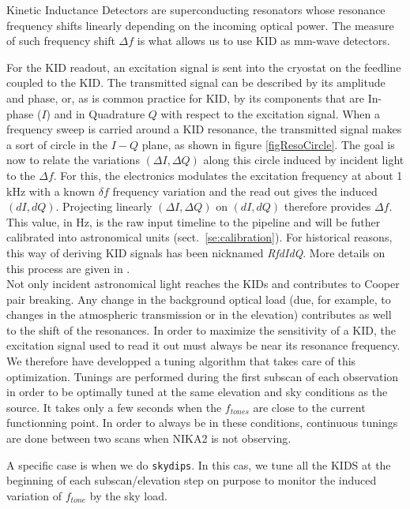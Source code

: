 Kinetic Inductance Detectors are superconducting resonators whose resonance
frequency shifts linearly depending on the incoming optical power. The measure of such
frequency shift $\Delta f$ is what allows us to use KID as mm-wave detectors.

For the KID readout, an excitation signal is sent into the cryostat on the
feedline coupled to the KID. The transmitted signal can be described by its
amplitude and phase, or, as is common practice for KID, by its components that
are In-phase ($I$) and in Quadrature $Q$ with respect to the excitation
signal. When a frequency sweep is carried around a KID resonance, the
transmitted signal makes a sort of circle in the $I-Q$ plane, as shown in figure
\ref{figResoCircle}. The goal is now to relate the variations $(\Delta I, \Delta
Q)$ along this circle induced by incident light to the $\Delta f$. For this, the
electronics modulates the excitation frequency at about 1\,kHz with a known
$\delta f$ frequency variation and the read out gives the induced $(dI,
dQ)$. Projecting linearly $(\Delta I, \Delta Q)$ on $(dI, dQ)$ therefore
provides $\Delta f$. This value, in Hz, is the raw input timeline to the
pipeline and will be futher calibrated into astronomical units
(sect.~\ref{se:calibration}). For historical reasons, this way of deriving KID
signals has been nicknamed \emph{RfdIdQ}. More details on this process are given
in \cite{Calvo13}.\\

Not only incident astronomical light reaches the KIDs and contributes to Cooper
pair breaking. Any change in the background optical load (due, for example, to changes in
the atmospheric transmission or in the elevation) contributes as well to the
shift of the resonances. In order to maximize the sensitivity of a KID, the
excitation signal used to read it out must always be near its resonance
frequency. We therefore have developped a tuning algorithm that takes care of
this optimization. Tunings are performed during the first subscan of each
observation in order to be optimally tuned at the same elevation and sky
conditions as the source. It takes only a few seconds when the $f_{tones}$ are
close to the current functionning point. In order to always be in these
conditions, continuous tunings are done between two scans when NIKA2 is not observing.

A specific case is when we do {\tt skydips}. In this cas, we tune all the KIDS
at the beginning of each subscan/elevation step on purpose to monitor the
induced variation of $f_{tone}$ by the sky load.
